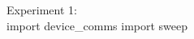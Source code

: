 \documentclass[paper.tex]{subfiles}%
\begin{document}
\clearpage
{\Large Experiment 1:}\\


\endmoddef\nwstartdeflinemarkup\nwenddeflinemarkup
import device_comms
import sweep
\nwendcode{}\nwdocspar

\nwenddocs{}\moddef{}\endmoddef\nwstartdeflinemarkup\nwenddeflinemarkup





\nwendcode{}\nwdocspar
\end{document}
